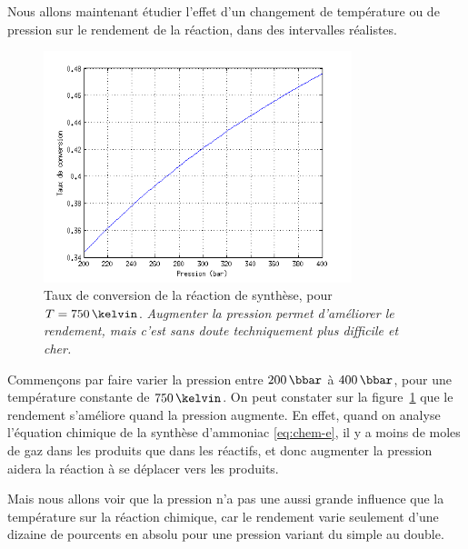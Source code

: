 Nous allons maintenant étudier l'effet d'un changement
de température ou de pression sur le rendement de la réaction,
dans des intervalles réalistes.

\begin{figure}
    \centering
    \includegraphics[width=0.8\textwidth]{img/param-press}
    \caption{
        Taux de conversion de la réaction de synthèse,
        pour $T=750\,\kelvin$.
        \emph{Augmenter la pression permet d'améliorer le rendement,
        mais c'est sans doute techniquement plus difficile et cher.}
    }
    \label{fig:param-press}
\end{figure}

Commençons par faire varier la pression entre $200\,\bbar$ à $400\,\bbar$, pour une température constante de $750\,\kelvin$.
On peut constater sur la figure~\ref{fig:param-press} que le rendement s'améliore quand la pression augmente. En effet, quand on analyse l'équation chimique de la synthèse d'ammoniac \eqref{eq:chem-e}, il y a moins de moles de gaz dans les produits que dans les réactifs, et donc augmenter la pression aidera la réaction à se déplacer vers les produits.

Mais nous allons voir que la pression n'a pas une aussi grande influence que la température sur la réaction chimique, car le rendement varie seulement d'une dizaine de pourcents en absolu pour une pression variant du simple au double.


